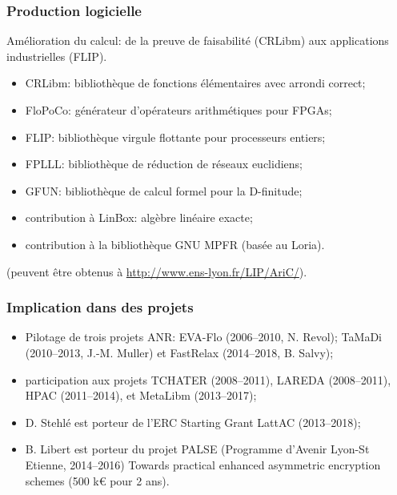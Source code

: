 \documentclass[mathsans]{beamer}
\begin{document}
\begin{frame}
\frametitle{Production logicielle}

Amélioration du calcul: de la preuve de faisabilité (CRLibm) aux applications industrielles (FLIP).
\begin{itemize}
\item \alert{CRLibm:} bibliothèque de fonctions élémentaires avec arrondi correct;
\item  \alert{FloPoCo:} générateur d'opérateurs arithmétiques pour FPGAs;
\item \alert{FLIP:} bibliothèque virgule flottante pour processeurs entiers;
\item \alert{FPLLL:} bibliothèque de réduction de réseaux euclidiens;
\item \alert{GFUN:} bibliothèque de calcul formel pour la D-finitude;
\item contribution à \alert{LinBox:} algèbre linéaire exacte;
\item  contribution à la bibliothèque \alert{GNU MPFR} (basée au Loria).
\end{itemize}
(peuvent être obtenus à \url{http://www.ens-lyon.fr/LIP/AriC/}).
\end{frame}

\begin{frame}
\frametitle{Implication dans des projets}
\begin{itemize}
    \item Pilotage de trois projets ANR: \alert{EVA-Flo} (2006--2010,  N. Revol); \alert{TaMaDi} (2010--2013,  J.-M. Muller) et \alert{FastRelax} (2014--2018,  B. Salvy);
     \item participation aux projets \alert{TCHATER} (2008--2011), \alert{LAREDA} (2008--2011),  \alert{HPAC} (2011--2014), et \alert{MetaLibm} (2013--2017);
     \item D. Stehlé est porteur de \alert{l'ERC Starting Grant LattAC} (2013--2018);
    \item B. Libert est porteur du projet PALSE (Programme d'Avenir Lyon-St Etienne, 2014--2016) \alert{Towards practical enhanced asymmetric encryption schemes} (500 k\euro{} pour 2 ans).
\end{itemize}
\end{frame}
\end{document}
